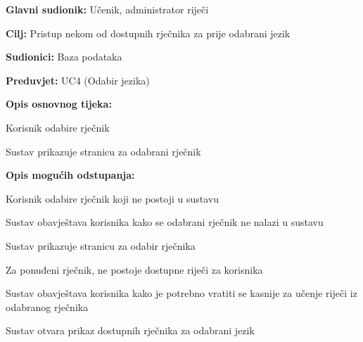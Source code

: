 					
					\noindent {}
					\begin{packed_item}
						
						\item \textbf{Glavni sudionik: }Učenik, administrator riječi
						\item  \textbf{Cilj:} Pristup nekom od dostupnih rječnika za prije odabrani jezik
						\item  \textbf{Sudionici:} Baza podataka
						\item  \textbf{Preduvjet:} UC4 (Odabir jezika)
						\item  \textbf{Opis osnovnog tijeka:}
						
						\item[] \begin{packed_enum}
							
							\item Korisnik odabire rječnik
							\item Sustav prikazuje stranicu za odabrani rječnik
						\end{packed_enum}
						
						\item  \textbf{Opis mogućih odstupanja:}
						
						\item[] \begin{packed_item}
							
							\item[1.a] Korisnik odabire rječnik koji ne postoji u sustavu
							\item[] \begin{packed_enum}
								
								\item Sustav obavještava korisnika kako se odabrani rječnik ne nalazi u sustavu
								\item Sustav prikazuje stranicu za odabir rječnika
								
							\end{packed_enum}
							
							\item[1.b] Za ponuđeni rječnik, ne postoje dostupne riječi za korisnika
							\item[] \begin{packed_enum}
								
								\item Sustav obavještava korisnika kako je potrebno vratiti se kasnije za učenje riječi iz odabranog rječnika
								\item Sustav otvara prikaz dostupnih rječnika za odabrani jezik
								

\end{packed_enum}
\end{packed_item}
\end{packed_item}
